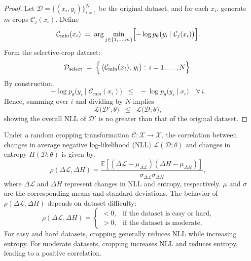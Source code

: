 \begin{proof}
Let \( \mathcal{D} = \{(x_i,y_i)\}_{i=1}^N \) be the original dataset, and for each \( x_i \),
generate \( m \) crops \( \mathcal{C}_j(x_i) \). Define
\[
\mathcal{C}_{\mathrm{min}}(x_i)
\;=\;
\arg \min_{j\in\{1,\dots,m\}}
\Bigl[-\log p_\theta\bigl(y_i \mid \mathcal{C}_j(x_i)\bigr)\Bigr].
\]
Form the selective-crop dataset:
\[
\mathcal{D}_{\mathrm{select}}
\;=\;
\Bigl\{\,
  \bigl(\mathcal{C}_{\mathrm{min}}(x_i),\,y_i\bigr)
  :\,i=1,\ldots,N
\Bigr\}.
\]
By construction,
\[
-\log p_\theta\bigl(y_i \mid \mathcal{C}_{\mathrm{min}}(x_i)\bigr)
\;\;\le\;\;
-\log p_\theta\bigl(y_i \mid x_i\bigr)\quad\forall\, i.
\]
Hence, summing over \( i \) and dividing by \( N \) implies
\[
\mathcal{L}\bigl(\mathcal{D}';\theta\bigr)
\;\;\le\;\;
\mathcal{L}\bigl(\mathcal{D};\theta\bigr),
\]
showing the overall NLL of \( \mathcal{D}' \) is no greater than that
of the original dataset.
\end{proof}

\begin{lemma}
\label{lemma:entropy_nll_correlation}
Under a random cropping transformation \( \mathcal{C}: \mathcal{X} \to \mathcal{X} \), the correlation between changes in average negative log-likelihood (NLL) \( \mathcal{L}(\mathcal{D}; \theta) \) and changes in entropy \( H(\mathcal{D}; \theta) \) is given by:
\[
\rho(\Delta\mathcal{L}, \Delta H) =
\frac{\mathbb{E}[(\Delta\mathcal{L} - \mu_{\Delta\mathcal{L}})(\Delta H - \mu_{\Delta H})]}{\sigma_{\Delta\mathcal{L}} \sigma_{\Delta H}},
\]
where \( \Delta\mathcal{L} \) and \( \Delta H \) represent changes in NLL and entropy, respectively. \( \mu \) and \( \sigma \) are the corresponding means and standard deviations. The behavior of \( \rho(\Delta\mathcal{L}, \Delta H) \) depends on dataset difficulty:
\[
\rho(\Delta\mathcal{L}, \Delta H) =
\begin{cases} 
    < 0, & \text{if the dataset is easy or hard,} \\
    > 0, & \text{if the dataset is moderate.}
\end{cases}
\]
For easy and hard datasets, cropping generally reduces NLL while increasing entropy. For moderate datasets, cropping increases NLL and reduces entropy, leading to a positive correlation.
\end{lemma}

